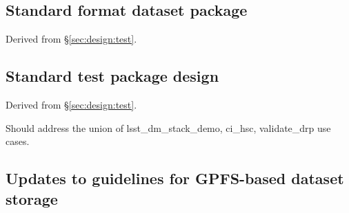 \subsection{Standard format dataset package}
\label{sec:comp:lfs-dataset}

Derived from \S\ref{sec:design:test}.


\subsection{Standard test package design}

Derived from \S\ref{sec:design:test}.


Should address the union of lsst\_dm\_stack\_demo, ci\_hsc, validate\_drp use
cases.

\subsection{Updates to guidelines for GPFS-based dataset storage}
\label{sec:comp:gpfs-dataset}
